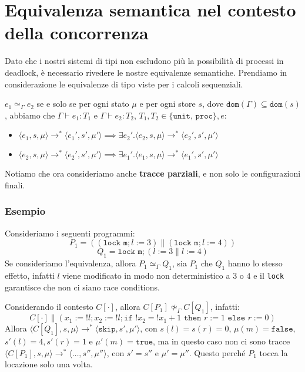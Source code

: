 \section{Equivalenza semantica nel contesto della concorrenza}
Dato che i nostri sistemi di tipi non escludono più la possibilità
di processi in deadlock, è necessario rivedere le nostre equivalenze semantiche.
Prendiamo
in considerazione le equivalenze di tipo viste per i calcoli sequenziali.
\begin{tcolorbox}[title = Equivalenza delle tracce $\simeq_\Gamma$]
    $e_1 \simeq_\Gamma e_2$ se e solo se per ogni stato $\mu$ e per ogni 
    store $s$, dove $\texttt{dom}(\Gamma) \subseteq \texttt{dom}(s)$,
    abbiamo che $\Gamma \vdash e_1 : T_1$ e $\Gamma \vdash e_2 : T_2$, 
    $T_1, T_2 \in \{ \texttt{unit, proc}\}, e$:
    \begin{itemize}
        \item $\langle e_1, s, \mu \rangle \rightarrow^* 
        \langle e_1', s', \mu' \rangle \implies 
        \exists e_2' . \langle e_2, s, \mu \rangle \rightarrow^*
        \langle e_2', s', \mu' \rangle$ 
        \item $\langle e_2, s, \mu \rangle \rightarrow^*
        \langle e_2', s', \mu' \rangle \implies
        \exists e_1' . \langle e_1, s, \mu \rangle \rightarrow^*
        \langle e_1', s', \mu' \rangle$
    \end{itemize}
\end{tcolorbox}
Notiamo che ora consideriamo anche \textbf{tracce parziali}, e non solo
le configurazioni finali.
\subsubsection{Esempio}
Consideriamo i seguenti programmi:
\[
    P_1 = ((\texttt{lock m}; l:=3) \parallel (\texttt{lock m}; l:=4))
\]
\[
    Q_1 = \texttt{lock m}; (l:=3 \parallel l:=4)
\]
Se consideriamo l'equivalenza, allora $P_1 \simeq_\Gamma Q_1$, 
sia $P_1$ che $Q_1$ hanno lo stesso effetto, infatti $l$ viene modificato 
in modo non deterministico a $3$ o $4$ e il \texttt{lock} garantisce che non ci 
siano race conditions.

Considerando il contesto $C[\cdot]$, allora $C[P_1] \not \simeq_\Gamma C[Q_1]$,
infatti:
\[
    C[\cdot] \parallel (x_1 := !l; x_2 := !l; \texttt{if }!x_2 = !x_1 + 1 \texttt{ then } 
    r:=1 \texttt{ else } r:=0)
\]
Allora $\langle C[Q_1], s, \mu \rangle \rightarrow^*
\langle \texttt{skip}, s', \mu' \rangle$, con 
$s(l) = s (r) = 0$, $\mu(m) = \texttt{false}$, $s'(l) = 4, s'(r) = 1$ e
$\mu'(m) = \texttt{true}$, ma in questo caso non ci sono tracce 
$\langle C[P_1], s, \mu \rangle \rightarrow^* \langle \dots, s'', \mu'' \rangle$,
con $s'=s''$ e $\mu' = \mu''$. Questo perché $P_1$ tocca la locazione solo una 
volta.

